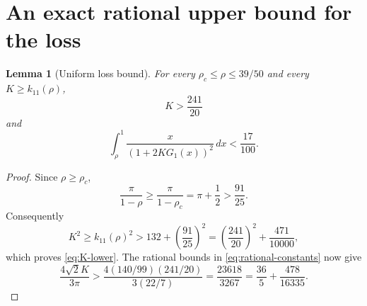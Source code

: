 \documentclass[11pt]{article}
\newtheorem{lemma}[theorem]{Lemma}
\theoremstyle{remark}
\begin{document}
\section{An exact rational upper bound for the loss}

\begin{lemma}[Uniform loss bound]
\label{lem:uniform-loss}
For every \(\rho_c\leq\rho\leq39/50\) and every
\(K\geq k_{11}(\rho)\),
\begin{equation}
 K>\frac{241}{20}
 \label{eq:K-lower}
\end{equation}
and
\begin{equation}
 \int_\rho^1
 \frac{x}{(1+2KG_1(x))^2}\,dx
 <\frac{17}{100}.
 \label{eq:loss-17}
\end{equation}
\end{lemma}

\begin{proof}
Since \(\rho\geq\rho_c\),
\[
 \frac{\pi}{1-\rho}\geq
 \frac{\pi}{1-\rho_c}=\pi+\frac12>\frac{91}{25}.
 \]
Consequently
\[
 K^2\geq k_{11}(\rho)^2
 >132+\left(\frac{91}{25}\right)^2
 =\left(\frac{241}{20}\right)^2+\frac{471}{10000},
 \]
which proves \eqref{eq:K-lower}.  The rational bounds in
\eqref{eq:rational-constants} now give
\begin{equation}
 \frac{4\sqrt2K}{3\pi}
 >
 \frac{4(140/99)(241/20)}{3(22/7)}
 =\frac{23618}{3267}
 =\frac{36}{5}+\frac{478}{16335}.
 \label{eq:turning-coefficient}
\end{equation}


\end{proof}
\end{document}
